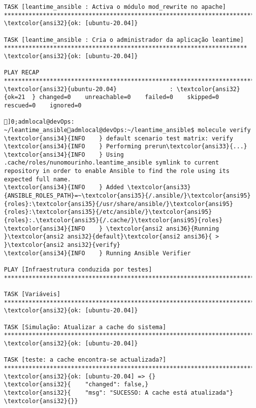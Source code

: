 \documentclass{scrartcl}
\begin{document}
\begin{Verbatim}
TASK [leantime_ansible : Activa o módulo mod_rewrite no apache] **************************************************************************
\textcolor{ansi32}{ok: [ubuntu-20.04]}

TASK [leantime_ansible : Cria o administrador da aplicação leantime] *********************************************************************
\textcolor{ansi32}{ok: [ubuntu-20.04]}

PLAY RECAP *******************************************************************************************************************************
\textcolor{ansi32}{ubuntu-20.04}               : \textcolor{ansi32}{ok=21  } changed=0    unreachable=0    failed=0    skipped=0    rescued=0    ignored=0

]0;admlocal@devOps: ~/leantime_ansibleadmlocal@devOps:~/leantime_ansible$ molecule verify
\textcolor{ansi34}{INFO    } default scenario test matrix: verify
\textcolor{ansi34}{INFO    } Performing prerun\textcolor{ansi33}{...}
\textcolor{ansi34}{INFO    } Using .cache/roles/nunomourinho.leantime_ansible symlink to current repository in order to enable Ansible to find the role using its expected full name.
\textcolor{ansi34}{INFO    } Added \textcolor{ansi33}{ANSIBLE_ROLES_PATH}=~\textcolor{ansi35}{/.ansible/}\textcolor{ansi95}{roles}:\textcolor{ansi35}{/usr/share/ansible/}\textcolor{ansi95}{roles}:\textcolor{ansi35}{/etc/ansible/}\textcolor{ansi95}{roles}:.\textcolor{ansi35}{/.cache/}\textcolor{ansi95}{roles}
\textcolor{ansi34}{INFO    } \textcolor{ansi2 ansi36}{Running }\textcolor{ansi2 ansi32}{default}\textcolor{ansi2 ansi36}{ > }\textcolor{ansi2 ansi32}{verify}
\textcolor{ansi34}{INFO    } Running Ansible Verifier

PLAY [Infraestrutura conduzida por testes] ***********************************************************************************************

TASK [Variáveis] *************************************************************************************************************************
\textcolor{ansi32}{ok: [ubuntu-20.04]}

TASK [Simulação: Atualizar a cache do sistema] *******************************************************************************************
\textcolor{ansi32}{ok: [ubuntu-20.04]}

TASK [teste: a cache encontra-se actualizada?] *******************************************************************************************
\textcolor{ansi32}{ok: [ubuntu-20.04] => {}
\textcolor{ansi32}{    "changed": false,}
\textcolor{ansi32}{    "msg": "SUCESSO: A cache está atualizada"}
\textcolor{ansi32}{}}


\end{Verbatim}
\end{document}
